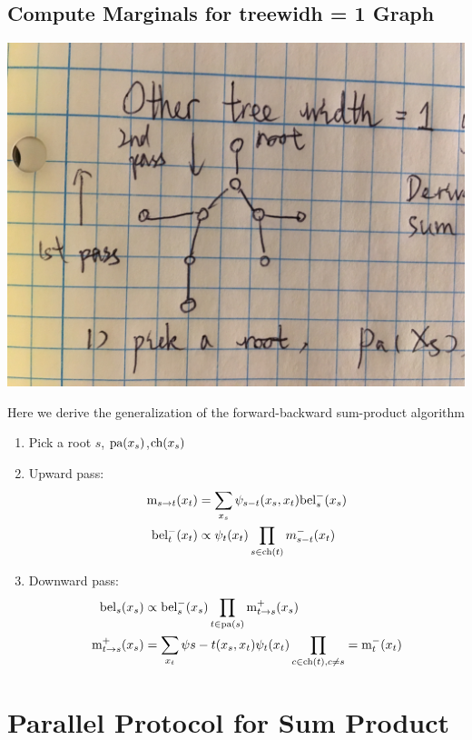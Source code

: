 \documentclass{article}
\begin{document}
\subsection{Compute Marginals for treewidh = 1 Graph}
\begin{center}
\includegraphics[scale=0.1]{g2.jpg}
\end{center}
Here we derive the generalization of the forward-backward sum-product algorithm
\begin{enumerate}
\item Pick a root  $s$, $\text{pa}(x_s)$,$\text{ch}(x_s)$
\item Upward pass:
\begin{align*}
\text{m}_{s\rightarrow t}(x_t)&=\sum_{x_s}\psi_{s-t}(x_s,x_t)\text{bel}_s^-(x_s)\\
\text{bel}_t^-(x_t)&\propto \psi_t(x_t)\prod_{s \in \text{ch}(t)} m_{s-t}^-(x_t)
\end{align*}
\item Downward pass:
\begin{align*}
\text{bel}_s(x_s)&\propto \text{bel}_s^-(x_s)\prod_{t \in \text{pa}(s)} \text{m}_{t\rightarrow s}^+(x_s) \\
\text{m}_{t\rightarrow s}^+ (x_s) &= \sum_{x_t} \psi{s-t}(x_s,x_t)\psi_t(x_t)\prod_{c \in \text{ch}(t), c \neq s}=\text{m}_t^-(x_t)
\end{align*}
\end{enumerate}

\section{Parallel Protocol for Sum Product}
\end{document}
